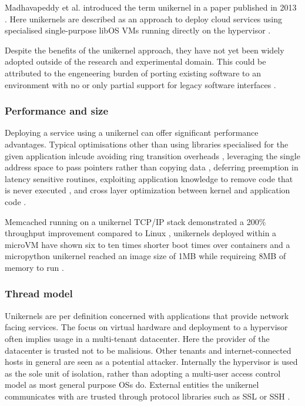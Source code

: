 \documentclass[10pt,twocolumn,a4paper]{article}
\begin{document}
    Madhavapeddy et al. introduced the term unikernel in a paper 
    published in 2013 \cite{madhavapeddy13}.
    Here unikernels are described as an approach to deploy cloud services
    using specialised single-purpose libOS VMs running directly 
    on the hypervisor \cite{madhavapeddy13}.

    Despite the benefits of the unikernel approach, they have not yet been widely adopted
    outside of the research and experimental domain.
    This could be attributed to the engeneering burden of porting existing software
    to an environment with no or only partial support for legacy software interfaces \cite{raza19}.
    
    \subsubsection{Performance and size}
      Deploying a service using a unikernel can offer significant
      performance advantages.
      Typical optimisations other than using libraries specialised for the given
      application inlcude avoiding ring transition overheads \cite{maeda2003},
      leveraging the single address space to pass pointers rather than copying data \cite {schatzberg16},
      deferring preemption in latency sensitive routines,
      exploiting application knowledge to remove code that is never executed \cite{madhavapeddy13},
      and cross layer optimization between kernel and application code \cite{raza19}.

      Memcached running on a unikernel TCP/IP stack
      demonstrated a 200\% throughput improvement compared to Linux \cite{schatzberg16},
      unikernels deployed within a microVM have shown six to ten times shorter
      boot times over containers \cite{koller17} and a micropython unikernel reached an image
      size of 1MB while requireing 8MB of memory to run \cite{manco17}.

    \subsubsection{Thread model}\label{sec:thread-model}
      Unikernels are per definition concerned with applications that provide network
      facing services. 
      The focus on virtual hardware and deployment to a hypervisor
      often implies usage in a multi-tenant datacenter.
      Here the provider of the datacenter is trusted not to be malisious.
      Other tenants and internet-connected hosts in general are seen as 
      a potential attacker.
      Internally the hypervisor is used as the sole unit of isolation, 
      rather than adopting a multi-user access control model as most general purpose OSs do.
      External entities the unikernel communicates with are trusted through
      protocol libraries such as SSL or SSH \cite{madhavapeddy13}.
\end{document}

